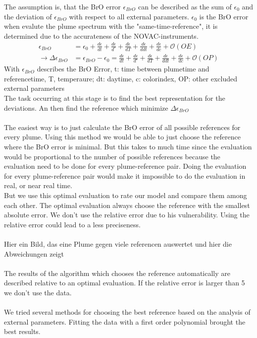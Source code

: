 \documentclass  [
  paper    = a4,
  BCOR     = 10mm,
  twoside,
  fontsize = 12pt,
  fleqn,
  toc      = bibnumbered,
  toc      = listofnumbered,
  numbers  = noendperiod,
  headings = normal,
  listof   = leveldown,
  version  = 3.03
]                                       {scrreprt}
\begin{document}
	The assumption is, that the BrO error $\epsilon_{BrO}$ can be described as the sum of $\epsilon_{0}$ and the deviation of $\epsilon_{BrO}$ with respect to all external parameters. $\epsilon_{0}$ is the BrO error when evalute the plume spectrum with the "same-time-reference", it is determined due to the accurateness of the NOVAC-instruments.
	\begin{align}
		\epsilon_{BrO} &=  \epsilon_{0}+\frac{d\epsilon}{dt}+\frac{d\epsilon}{d ^{\circ}}+\frac{d\epsilon}{dT}+\frac{d\epsilon}{ddt} +\frac{d\epsilon}{dc} + \mathcal{O}\left(OE\right) \\
		\rightarrow \Delta \epsilon_{BrO} &= \epsilon_{BrO} - \epsilon_{0} =\frac{d\epsilon}{dt}+\frac{d\epsilon}{d ^{\circ}}+\frac{d\epsilon}{dT}+\frac{d\epsilon}{ddt} +\frac{d\epsilon}{dc} + \mathcal{O}\left(OP\right) 
		\label{calc:err}
	\end{align}
	With $\epsilon_{BrO}$ describes the BrO Error, t: time between plumetime and referencetime, T, temperaure; dt: daytime, c: colorindex, OP: other excluded external parameters\\
	The task occurring at this stage is to find the best representation for the deviations. An then find the reference which minimize $\Delta \epsilon_{BrO} $\\
	\\
	The easiest way is to just calculate the BrO error of all possible references for every plume. Using this method we would be able to just choose the reference where the BrO error is minimal. But this takes to much time since the evaluation would be proportional to the number of possible references because the evaluation need to be done for every plume-reference pair. Doing the evaluation for every plume-reference pair would make it impossible to do the evaluation in real, or near real time.\\
	But we use this optimal evaluation to rate our model and compare them among each other. The optimal evaluation always choose the reference with the smallest absolute error. We don't use the relative error due to his vulnerability. Using the relative error could lead to a less preciseness.\\
	\\
	Hier ein Bild, das eine Plume gegen viele referencen auswertet und hier die Abweichungen zeigt\\
	\\
	The results of the algorithm which chooses the reference automatically are described relative to an optimal evaluation. If the relative error is larger than 5 we don't use the data.\\
	\\
	We tried several methods for choosing the best reference based on the analysis of external parameters. Fitting the data with a first order polynomial brought the best results.
	
\end{document}
